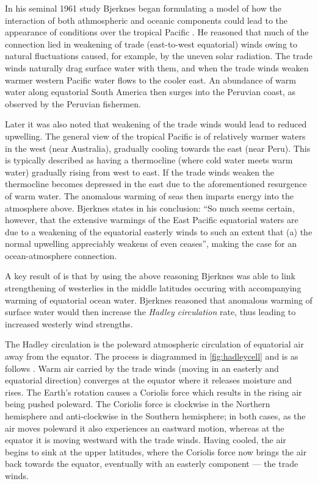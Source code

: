 \vspace{0.5cm}

In his seminal 1961 study Bjerknes began formulating a model of how the
interaction of both athmospheric and oceanic components could lead to the
appearance of \elnino{} conditions over the tropical Pacific
\citep{bjerknes1961}. He reasoned that much of the connection lied in weakening
of trade (east-to-west equatorial) winds owing to natural fluctuations caused,
for example, by the uneven solar radiation. The trade winds naturally drag
surface water with them, and when the trade winds weaken warmer western Pacific
water flows to the cooler east. An abundance of warm water along equatorial
South America then surges into the Peruvian coast, as observed by the Peruvian
fishermen.

Later \citep{bjerknes1966} it was also noted that weakening of the trade winds
would lead to reduced upwelling. The general view of the tropical Pacific is of
relatively warmer waters in the west (near Australia), gradually cooling towards
the east (near Peru). This is typically described as having a thermocline (where
cold water meets warm water) gradually rising from west to east. If the trade
winds weaken the thermocline becomes depressed in the east due to the
aforementioned resurgence of warm water. The anomalous warming of seas then
imparts energy into the atmosphere above. Bjerknes states in his conclusion:
``So much seems certain, however, that the extensive warmings of the East
Pacific equatorial waters are due to a weakening of the equatorial easterly
winds to such an extent that (a) the normal upwelling appreciably weakens of
even ceases'', making the case for an ocean-atmosphere connection.

A key result of \citep{bjerknes1966} is that by using the above reasoning
Bjerknes was able to link strengthening of westerlies in the middle latitudes
occuring with accompanying warming of equatorial ocean water. Bjerknes reasoned
that anomalous warming of surface water would then increase the \emph{Hadley
  circulation} rate, thus leading to increased westerly wind strengths.

The Hadley circulation is the poleward atmospheric circulation of
equatorial air away from the equator. The process is diagrammed in
\ref{fig:hadleycell} and is as follows \citep{geomar6557}. Warm air carried by
the trade winds (moving in an easterly and equatorial direction) converges at
the equator where it releases moisture and rises. The Earth's rotation causes a
Coriolis force which results in the rising air being pushed poleward. The
Coriolis force is clockwise in the Northern hemisphere and anti-clockwise in the
Southern hemisphere; in both cases, as the air moves poleward it also
experiences an eastward motion, whereas at the equator it is moving westward
with the trade winds. Having cooled, the air begins to sink at the upper
latitudes, where the Coriolis force now brings the air back towards the equator,
eventually with an easterly component --- the trade winds.

